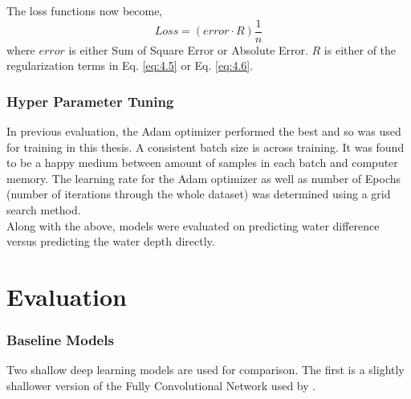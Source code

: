 The loss functions now become,
\begin{equation}
	\label{4.7}
	Loss = (error \cdot R) \frac{1}{n}
\end{equation}
where $error$ is either Sum of Square Error or Absolute Error. $R$ is either of the regularization terms in Eq. \ref{eq:4.5} or Eq. \ref{eq:4.6}.

\subsubsection*{Hyper Parameter Tuning}
In previous evaluation, the Adam optimizer performed the best and so was used for training in this thesis. A consistent batch size is across training. It was found to be a happy medium between amount of samples in each batch and computer memory. The learning rate for the Adam optimizer as well as number of Epochs (number of iterations through the whole dataset) was determined using a grid search method. \\

Along with the above, models were evaluated on predicting water difference versus predicting the water depth directly.

\section{Evaluation}

\subsubsection*{Baseline Models}
Two shallow deep learning models are used for comparison. The first is a slightly shallower version of the Fully Convolutional Network used by \citeauthor{russo2023evaluation}.

